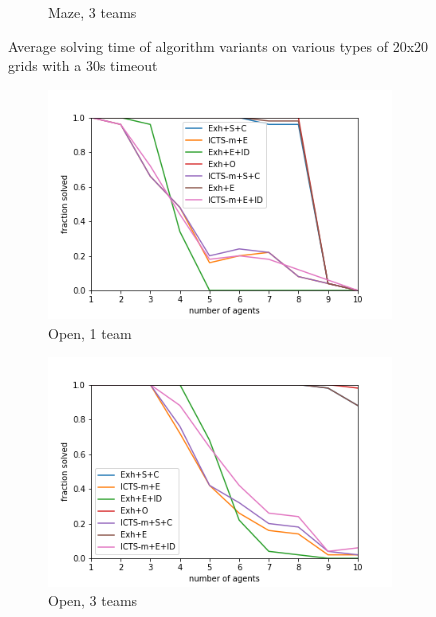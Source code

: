 \documentclass[english]{article}
\begin{document}
\begin{figure}
\begin{subfigure}{0.49\textwidth}
			\caption{Maze, 3 teams}
			\label{fig:m3}
		\end{subfigure}
		\caption{Average solving time of algorithm variants on various types of 20x20 grids with a 30s timeout}
		\label{fig:bottom}
	\end{figure}

	\begin{figure}
	\centering
	\begin{subfigure}{0.49\textwidth}
		\centering
		\includegraphics[width=\linewidth]{img/results/open-1-p}
		\caption{Open, 1 team}
		\label{fig:open1}
	\end{subfigure}
	\begin{subfigure}{0.49\textwidth}
		\centering
		\includegraphics[width=\linewidth]{img/results/open-3-p}
		\caption{Open, 3 teams}
		\label{fig:open3}
	\end{subfigure}
	\begin{subfigure}{0.49\textwidth}

\end{subfigure}
\end{figure}
\end{document}
